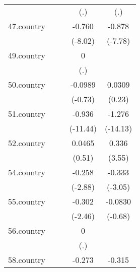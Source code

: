 {\begin{tabular}{l*{4}{c}}
            &                     &                     &         (.)         &         (.)         \\
[1em]
47.country  &                     &                     &      -0.760\sym{***}&      -0.878\sym{***}\\
            &                     &                     &     (-8.02)         &     (-7.78)         \\
[1em]
49.country  &                     &                     &           0         &                     \\
            &                     &                     &         (.)         &                     \\
[1em]
50.country  &                     &                     &     -0.0989         &      0.0309         \\
            &                     &                     &     (-0.73)         &      (0.23)         \\
[1em]
51.country  &                     &                     &      -0.936\sym{***}&      -1.276\sym{***}\\
            &                     &                     &    (-11.44)         &    (-14.13)         \\
[1em]
52.country  &                     &                     &      0.0465         &       0.336\sym{***}\\
            &                     &                     &      (0.51)         &      (3.55)         \\
[1em]
54.country  &                     &                     &      -0.258\sym{**} &      -0.333\sym{**} \\
            &                     &                     &     (-2.88)         &     (-3.05)         \\
[1em]
55.country  &                     &                     &      -0.302\sym{*}  &     -0.0830         \\
            &                     &                     &     (-2.46)         &     (-0.68)         \\
[1em]
56.country  &                     &                     &           0         &                     \\
            &                     &                     &         (.)         &                     \\
[1em]
58.country  &                     &                     &      -0.273\sym{**} &      -0.315\sym{**} \\

\end{tabular}}
